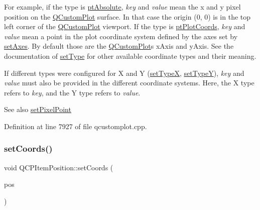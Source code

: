 For example, if the type is \hyperlink{class_q_c_p_item_position_aad9936c22bf43e3d358552f6e86dbdc8a564f5e53e550ead1ec5fc7fc7d0b73e0}{pt\+Absolute}, {\itshape key} and {\itshape value} mean the x and y pixel position on the \hyperlink{class_q_custom_plot}{Q\+Custom\+Plot} surface. In that case the origin (0, 0) is in the top left corner of the \hyperlink{class_q_custom_plot}{Q\+Custom\+Plot} viewport. If the type is \hyperlink{class_q_c_p_item_position_aad9936c22bf43e3d358552f6e86dbdc8ad5ffb8dc99ad73263f7010c77342294c}{pt\+Plot\+Coords}, {\itshape key} and {\itshape value} mean a point in the plot coordinate system defined by the axes set by \hyperlink{class_q_c_p_item_position_a2185f45c75ac8cb9be89daeaaad50e37}{set\+Axes}. By default those are the \hyperlink{class_q_custom_plot}{Q\+Custom\+Plot}\textquotesingle{}s x\+Axis and y\+Axis. See the documentation of \hyperlink{class_q_c_p_item_position_aa476abf71ed8fa4c537457ebb1a754ad}{set\+Type} for other available coordinate types and their meaning.

If different types were configured for X and Y (\hyperlink{class_q_c_p_item_position_a2113b2351d6d00457fb3559a4e20c3ea}{set\+TypeX}, \hyperlink{class_q_c_p_item_position_ac2a454aa5a54c1615c50686601ec4510}{set\+TypeY}), {\itshape key} and {\itshape value} must also be provided in the different coordinate systems. Here, the X type refers to {\itshape key}, and the Y type refers to {\itshape value}.

\begin{DoxySeeAlso}{See also}
\hyperlink{class_q_c_p_item_position_ab404e56d9ac2ac2df0382c57933a71ef}{set\+Pixel\+Point} 
\end{DoxySeeAlso}


Definition at line 7927 of file qcustomplot.\+cpp.

\mbox{\label{class_q_c_p_item_position_acc70b3abc143287f806e5f154e5e07b0}} 
\subsubsection{\texorpdfstring{set\+Coords()}{setCoords()}\hspace{0.1cm}{\footnotesize\ttfamily [2/2]}}
{\footnotesize\ttfamily void Q\+C\+P\+Item\+Position\+::set\+Coords (\begin{DoxyParamCaption}\item[{const Q\+PointF \&}]{pos }\end{DoxyParamCaption})}

